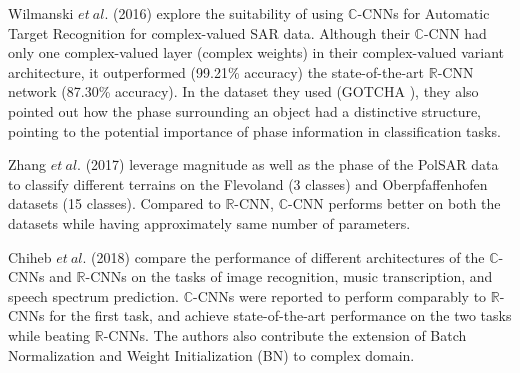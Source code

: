Wilmanski $et \ al.$ (2016) \cite{wilmanski2016complex} explore the suitability of using $\mathbb{C}$-CNNs for Automatic Target Recognition for complex-valued SAR data. Although their $\mathbb{C}$-CNN had only one complex-valued layer (complex weights) in their complex-valued variant architecture, it outperformed (99.21\% accuracy) the state-of-the-art $\mathbb{R}$-CNN network (87.30\% accuracy). In the dataset they used (GOTCHA \cite{gotcha}), they also pointed out how the phase surrounding an object had a distinctive structure, pointing to the potential importance of phase information in classification tasks.

Zhang $et \ al.$ (2017) \cite{polsarzhang2017complex} leverage magnitude as well as the phase of the PolSAR data to classify different terrains on the Flevoland (3 classes) and Oberpfaffenhofen datasets (15 classes). Compared to $\mathbb{R}$-CNN, $\mathbb{C}$-CNN performs better on both the datasets while having approximately same number of parameters.  

Chiheb $et \ al.$ (2018) \cite{trabelsi2018deep} compare the performance of different architectures of the $\mathbb{C}$-CNNs and $\mathbb{R}$-CNNs on the tasks of image recognition, music transcription, and speech spectrum prediction. $\mathbb{C}$-CNNs were reported to perform comparably to $\mathbb{R}$-CNNs for the first task, and achieve state-of-the-art performance on the two tasks while beating $\mathbb{R}$-CNNs. The authors also contribute the extension of Batch Normalization and Weight Initialization (BN) to complex domain. 